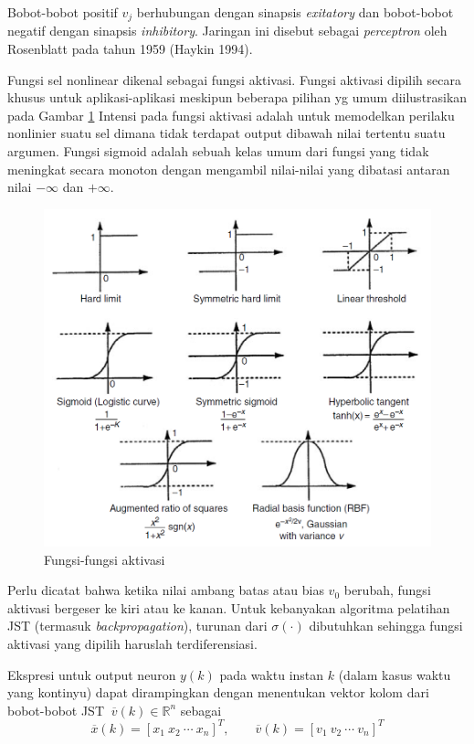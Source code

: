 Bobot-bobot positif  $v_j$ berhubungan dengan sinapsis \textit{exitatory} dan bobot-bobot negatif dengan sinapsis \textit{inhibitory}. Jaringan ini disebut sebagai \textit{perceptron} oleh Rosenblatt pada tahun 1959 (Haykin 1994).

Fungsi sel nonlinear dikenal sebagai fungsi aktivasi. Fungsi aktivasi dipilih secara khusus untuk aplikasi-aplikasi meskipun beberapa pilihan yg umum diilustrasikan pada Gambar \ref{fig:3:activation} Intensi pada fungsi aktivasi adalah untuk memodelkan perilaku nonlinier suatu sel dimana tidak terdapat output dibawah nilai tertentu suatu argumen. Fungsi sigmoid adalah sebuah kelas umum dari fungsi yang tidak meningkat secara monoton dengan mengambil nilai-nilai yang dibatasi antaran nilai $-\infty$ dan $+\infty$. 
\begin{figure}[!h]
	\centering
	\includegraphics[width=1\textwidth]{figures/activationFunction}
	\caption{Fungsi-fungsi aktivasi}
	\label{fig:3:activation}
\end{figure}
Perlu dicatat bahwa ketika nilai ambang batas atau bias $v_0$ berubah, fungsi aktivasi bergeser ke kiri atau ke kanan. Untuk kebanyakan algoritma pelatihan JST (termasuk \textit{backpropagation}), turunan dari $\sigma(\cdot)$ dibutuhkan sehingga fungsi aktivasi yang dipilih haruslah terdiferensiasi.

Ekspresi untuk output neuron $y(k)$ pada waktu instan $k$ (dalam kasus waktu yang kontinyu) dapat dirampingkan dengan menentukan vektor kolom dari bobot-bobot JST $\ \overline{v}(k) \in \mathbb{R}^n $ sebagai
\vspace{-1em}
\begin{equation} \label{eq:3:vektorKolom}
\overline{x}(k) = [x_1\ x_2\ \cdots\ x_n]^T, \qquad \overline{v}(k) = [v_1\ v_2\ \cdots\ v_n]^T
\end{equation}

